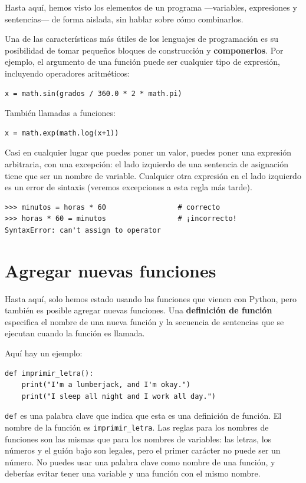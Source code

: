 \documentclass[10pt]{book}
\begin{document}
Hasta aquí, hemos visto los elementos de un programa ---variables,
expresiones y sentencias--- de forma aislada, sin hablar sobre cómo
combinarlos.

Una de las características más útiles de los lenguajes de programación es su
posibilidad de tomar pequeños bloques de construcción y {\bf componerlos}.  Por
ejemplo, el argumento de una función puede ser cualquier tipo de expresión,
incluyendo operadores aritméticos:

\begin{verbatim}
x = math.sin(grados / 360.0 * 2 * math.pi)
\end{verbatim}
%
También llamadas a funciones:

\begin{verbatim}
x = math.exp(math.log(x+1))
\end{verbatim}
%
Casi en cualquier lugar que puedes poner un valor, puedes poner una expresión
arbitraria, con una excepción: el lado izquierdo de una sentencia
de asignación tiene que ser un nombre de variable. Cualquier otra expresión en el lado
izquierdo es un error de sintaxis (veremos excepciones a esta regla
más tarde).

\begin{verbatim}
>>> minutos = horas * 60                 # correcto
>>> horas * 60 = minutos                 # ¡incorrecto!
SyntaxError: can't assign to operator
\end{verbatim}
%


\section{Agregar nuevas funciones}

Hasta aquí, solo hemos estado usando las funciones que vienen con Python,
pero también es posible agregar nuevas funciones.
Una {\bf definición de función} especifica el nombre de una nueva función y
la secuencia de sentencias que se ejecutan cuando la función es llamada.

Aquí hay un ejemplo:

\begin{verbatim}
def imprimir_letra():
    print("I'm a lumberjack, and I'm okay.")
    print("I sleep all night and I work all day.")
\end{verbatim}
%
{\tt def} es una palabra clave que indica que esta es una definición
de función. El nombre de la función es \verb"imprimir_letra".  Las
reglas para los nombres de funciones son las mismas que para los nombres de variables: las letras,
los números y el guión bajo son legales, pero el primer carácter
no puede ser un número.  No puedes usar una palabra clave como nombre de una función,
y deberías evitar tener una variable y una función con el mismo
nombre.
\end{document}
